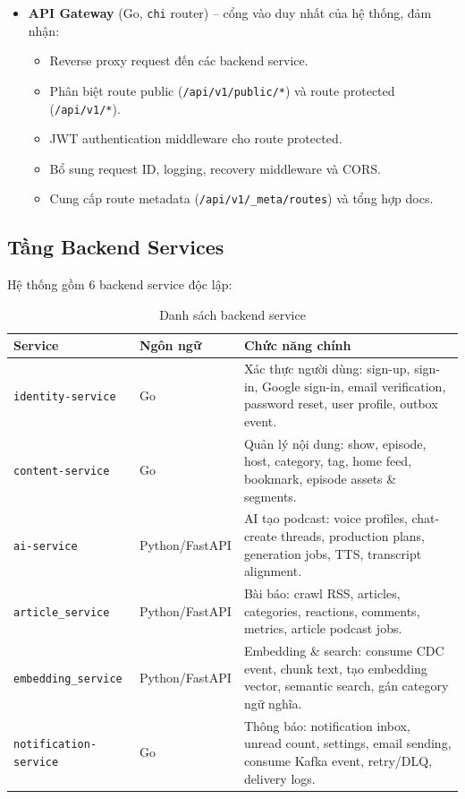 \documentclass[14pt,a4paper,oneside]{extreport}
\begin{document}
\begin{itemize}[leftmargin=2cm]
  \item \textbf{API Gateway} (Go, \texttt{chi} router) -- cổng vào duy nhất của hệ thống, đảm nhận:
  \begin{itemize}
    \item Reverse proxy request đến các backend service.
    \item Phân biệt route public (\texttt{/api/v1/public/*}) và route protected (\texttt{/api/v1/*}).
    \item JWT authentication middleware cho route protected.
    \item Bổ sung request ID, logging, recovery middleware và CORS.
    \item Cung cấp route metadata (\texttt{/api/v1/\_meta/routes}) và tổng hợp docs.
  \end{itemize}
\end{itemize}

\subsection{Tầng Backend Services}

Hệ thống gồm 6 backend service độc lập:

\begin{table}[H]
\centering
\caption{Danh sách backend service}
\label{tab:backend-services}
\renewcommand{\arraystretch}{1.3}
\small
\begin{tabularx}{\textwidth}{|l|l|X|}
\hline
\textbf{Service} & \textbf{Ngôn ngữ} & \textbf{Chức năng chính} \\
\hline
\texttt{identity-service} & Go &
  Xác thực người dùng: sign-up, sign-in, Google sign-in, email verification, password reset, user profile, outbox event. \\
\hline
\texttt{content-service} & Go &
  Quản lý nội dung: show, episode, host, category, tag, home feed, bookmark, episode assets \& segments. \\
\hline
\texttt{ai-service} & Python/FastAPI &
  AI tạo podcast: voice profiles, chat-create threads, production plans, generation jobs, TTS, transcript alignment. \\
\hline
\texttt{article\_service} & Python/FastAPI &
  Bài báo: crawl RSS, articles, categories, reactions, comments, metrics, article podcast jobs. \\
\hline
\texttt{embedding\_service} & Python/FastAPI &
  Embedding \& search: consume CDC event, chunk text, tạo embedding vector, semantic search, gán category ngữ nghĩa. \\
\hline
\texttt{notification-service} & Go &
  Thông báo: notification inbox, unread count, settings, email sending, consume Kafka event, retry/DLQ, delivery logs. \\
\hline
\end{tabularx}
\end{table}
\end{document}
